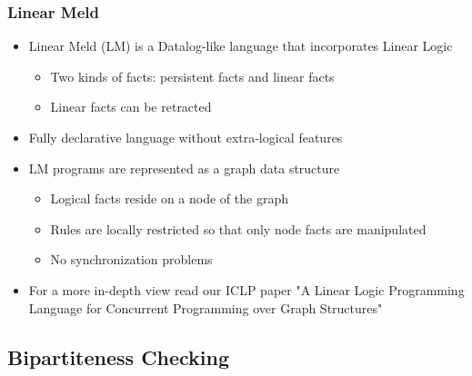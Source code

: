 \documentclass{beamer}
\begin{document}
\frame
{
   \frametitle{Linear Meld}
   \begin{itemize}
      \item Linear Meld (LM) is a Datalog-like language that incorporates Linear Logic
      \begin{itemize}
         \item Two kinds of facts: persistent facts and linear facts
         \item Linear facts can be retracted
      \end{itemize}
      \item Fully declarative language without extra-logical features
      \item LM programs are represented as a graph data structure
      \begin{itemize}
         \item Logical facts reside on a node of the graph
         \item Rules are locally restricted so that only node facts are manipulated
         \item No synchronization problems
      \end{itemize}
      \item For a more in-depth view read our ICLP paper "A Linear Logic Programming Language for Concurrent Programming over Graph Structures"
   \end{itemize}
}

\subsection{Bipartiteness Checking}
\end{document}
